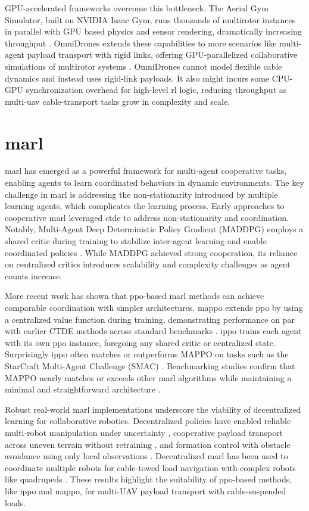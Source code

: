 GPU-accelerated frameworks overcome this bottleneck. The Aerial Gym Simulator, built on NVIDIA Isaac Gym, runs thousands of multirotor instances in parallel with GPU based physics and sensor rendering, dramatically increasing throughput \cite{aerial_gym_simulator}. OmniDrones extends these capabilities to more scenarios like multi-agent payload transport with rigid links, offering GPU-parallelized collaborative simulations of multirotor systems \cite{xu2023omnidrones}. OmniDrones cannot model flexible cable dynamics and instead uses rigid-link payloads. It also might incurs some CPU-GPU synchronization overhead for high-level \gls{rl} logic, reducing throughput as multi-\gls{uav} cable-transport tasks grow in complexity and scale. 

\section{\gls{marl}}
\gls{marl} has emerged as a powerful framework for multi-agent cooperative tasks, enabling agents to learn coordinated behaviors in dynamic environments. The key challenge in \gls{marl} is addressing the non-stationarity introduced by multiple learning agents, which complicates the learning process.
Early approaches to cooperative \gls{marl} leveraged \gls{ctde} to address non-stationarity and coordination. Notably, Multi-Agent Deep Deterministic Policy Gradient (MADDPG) employs a shared critic during training to stabilize inter-agent learning and enable coordinated policies \cite{Lowe2017MultiAgentAF}. While MADDPG achieved strong cooperation, its reliance on centralized critics introduces scalability and complexity challenges as agent counts increase.

More recent work has shown that \gls{ppo}-based \gls{marl} methods can achieve comparable coordination with simpler architectures. \gls{mappo} extends \gls{ppo} by using a centralized value function during training, demonstrating performance on par with earlier CTDE methods across standard benchmarks \cite{yu_surprising_2022}. \gls{ippo} trains each agent with its own \gls{ppo} instance, foregoing any shared critic or centralized state. Surprisingly \gls{ippo} often matches or outperforms MAPPO on tasks such as the StarCraft Multi-Agent Challenge (SMAC) \cite{witt_is_2020}. Benchmarking studies confirm that MAPPO nearly matches or exceeds other \gls{marl} algorithms while maintaining a minimal and straightforward architecture \cite{Papoudakis2020BenchmarkingMD}.

Robust real-world \gls{marl} implementations underscore the viability of decentralized learning for collaborative robotics. Decentralized policies have enabled reliable multi-robot manipulation under uncertainty \cite{Chen2022TowardsHBA}, cooperative payload transport across uneven terrain without retraining \cite{Pandit2024LearningDM}, and formation control with obstacle avoidance using only local observations \cite{Ji2021ReinforcementLF}. Decentralized \gls{marl} has been used to coordinate multiple robots for cable-towed load navigation with complex robots like quadrupeds \cite{Chen2025DecentralizedNO}. These results highlight the suitability of \gls{ppo}-based methods, like \gls{ippo} and \gls{mappo}, for multi-UAV payload transport with cable-suspended loads.


